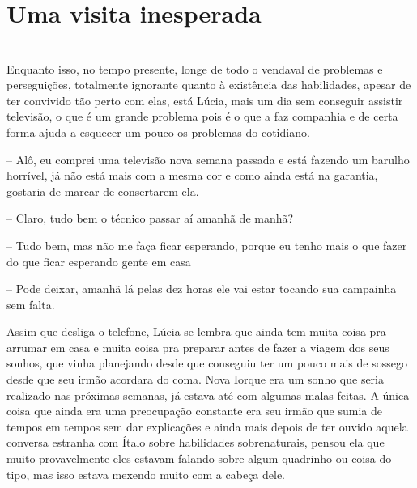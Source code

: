 
    
    
    
\newpage
    
    
\ifdefined\useChapters
    \chapter{Uma visita inesperada}

\else
\chapter{}
\fi

Enquanto isso, no tempo presente, longe de todo o vendaval de problemas e perseguições, totalmente ignorante quanto à existência das habilidades, apesar de ter convivido tão perto com elas, está Lúcia, mais um dia sem conseguir assistir televisão, o que é um grande problema pois é o que a faz companhia e de certa forma ajuda a esquecer um pouco os problemas do cotidiano.

-- Alô, eu comprei uma televisão nova semana passada e está fazendo um barulho horrível, já não está mais com a mesma cor e como ainda está na garantia, gostaria de marcar de consertarem ela.

-- Claro, tudo bem o técnico passar aí amanhã de manhã?

-- Tudo bem, mas não me faça ficar esperando, porque eu tenho mais o que fazer do que ficar esperando gente em casa

-- Pode deixar, amanhã lá pelas dez horas ele vai estar tocando sua campainha sem falta.

Assim que desliga o telefone, Lúcia se lembra que ainda tem muita coisa pra arrumar em casa e muita coisa pra preparar antes de fazer a viagem dos seus sonhos, que vinha planejando desde que conseguiu ter um pouco mais de sossego desde que seu irmão acordara do coma. Nova Iorque era um sonho que seria realizado nas próximas semanas, já estava até com algumas malas feitas. A única coisa que ainda era uma preocupação constante era seu irmão que sumia de tempos em tempos sem dar explicações e ainda mais depois de ter ouvido aquela conversa estranha com Ítalo sobre habilidades sobrenaturais, pensou ela que muito provavelmente eles estavam falando sobre algum quadrinho ou coisa do tipo, mas isso estava mexendo muito com a cabeça dele. 

